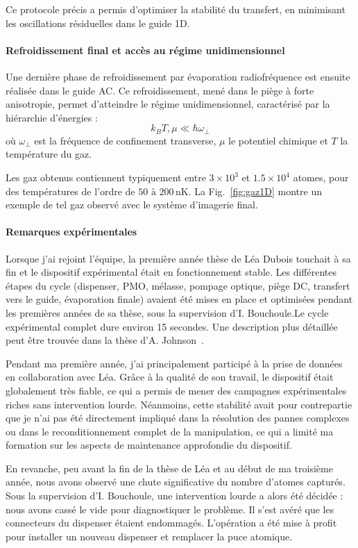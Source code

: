 Ce protocole précis a permis d’optimiser la stabilité du transfert, en minimisant les oscillations résiduelles dans le guide 1D.

\paragraph{Refroidissement final et accès au régime unidimensionnel}
Une dernière phase de refroidissement par évaporation radiofréquence est ensuite réalisée dans le guide AC. Ce refroidissement, mené dans le piège à forte anisotropie, permet d’atteindre le régime unidimensionnel, caractérisé par la hiérarchie d’énergies :
\[
k_B T, \mu \ll \hbar \omega_\perp
\]
où \( \omega_\perp \) est la fréquence de confinement transverse, \( \mu \) le potentiel chimique et \( T \) la température du gaz.

Les gaz obtenus contiennent typiquement entre \( 3 \times 10^3 \) et \( 1.5 \times 10^4 \) atomes, pour des températures de l’ordre de \( 50 \text{ à } 200\,\mathrm{nK} \). La Fig.~\ref{fig:gaz1D} montre un exemple de tel gaz observé avec le système d’imagerie final.


\paragraph{Remarques expérimentales}
Lorsque j’ai rejoint l’équipe, la première année thèse de Léa Dubois touchait à sa fin et le dispositif expérimental était en fonctionnement stable. Les différentes étapes du cycle (dispenser, PMO, mélasse, pompage optique, piège DC, transfert vers le guide, évaporation finale) avaient été mises en place et optimisées pendant les premières années de sa thèse, sous la supervision d’I. Bouchoule.Le cycle expérimental complet dure environ 15 secondes. Une description plus détaillée peut être trouvée dans la thèse d’A. Johnson~\cite{Johnson2016}.


Pendant ma première année, j’ai principalement participé à la prise de données en collaboration avec Léa. Grâce à la qualité de son travail, le dispositif était globalement très fiable, ce qui a permis de mener des campagnes expérimentales riches sans intervention lourde. Néanmoins, cette stabilité avait pour contrepartie que je n’ai pas été directement impliqué dans la résolution des pannes complexes ou dans le reconditionnement complet de la manipulation, ce qui a limité ma formation sur les aspects de maintenance approfondie du dispositif.

En revanche, peu avant la fin de la thèse de Léa et au début de ma troisième année, nous avons observé une chute significative du nombre d’atomes capturés. Sous la supervision d’I. Bouchoule, une intervention lourde a alors été décidée : nous avons cassé le vide pour diagnostiquer le problème. Il s’est avéré que les connecteurs du dispenser étaient endommagés. L’opération a été mise à profit pour installer un nouveau dispenser et remplacer la puce atomique.

